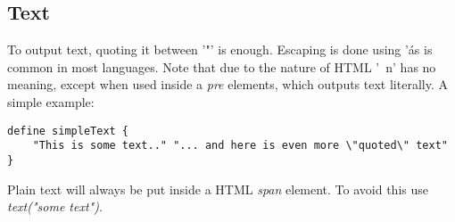 \subsection{Text}
To output text, quoting it between '"' is enough. Escaping is done using '\' as is common in most languages. Note that due to the nature of HTML '\ n' has no meaning, except when used inside a \emph{pre} elements, which outputs text literally. A simple example:
\begin{lstlisting}
define simpleText {
	"This is some text.." "... and here is even more \"quoted\" text"
}
\end{lstlisting}
Plain text will always be put inside a HTML \emph{span} element. To avoid this use \emph{text("some text")}.


